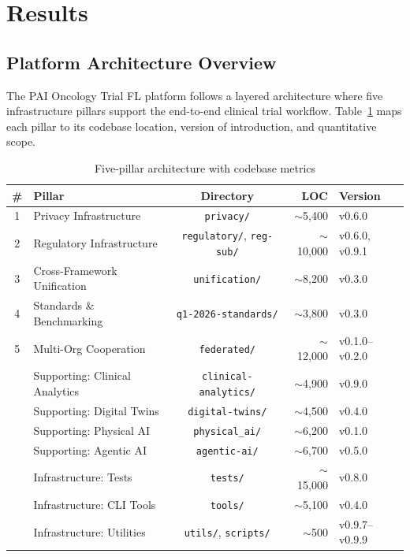 \section{Results}
\label{sec:results}

\subsection{Platform Architecture Overview}

The PAI Oncology Trial FL platform follows a layered architecture where five infrastructure pillars support the end-to-end clinical trial workflow. Table~\ref{tab:architecture} maps each pillar to its codebase location, version of introduction, and quantitative scope.

\begin{table}[H]
\centering
\caption{Five-pillar architecture with codebase metrics}
\label{tab:architecture}
\small
\begin{tabular}{@{}clcrl@{}}
\toprule
\textbf{\#} & \textbf{Pillar} & \textbf{Directory} & \textbf{LOC} & \textbf{Version} \\
\midrule
1 & Privacy Infrastructure & \texttt{privacy/} & $\sim$5,400 & v0.6.0 \\
2 & Regulatory Infrastructure & \texttt{regulatory/}, \texttt{reg-sub/} & $\sim$10,000 & v0.6.0, v0.9.1 \\
3 & Cross-Framework Unification & \texttt{unification/} & $\sim$8,200 & v0.3.0 \\
4 & Standards \& Benchmarking & \texttt{q1-2026-standards/} & $\sim$3,800 & v0.3.0 \\
5 & Multi-Org Cooperation & \texttt{federated/} & $\sim$12,000 & v0.1.0--v0.2.0 \\
\midrule
  & Supporting: Clinical Analytics & \texttt{clinical-analytics/} & $\sim$4,900 & v0.9.0 \\
  & Supporting: Digital Twins & \texttt{digital-twins/} & $\sim$4,500 & v0.4.0 \\
  & Supporting: Physical AI & \texttt{physical\_ai/} & $\sim$6,200 & v0.1.0 \\
  & Supporting: Agentic AI & \texttt{agentic-ai/} & $\sim$6,700 & v0.5.0 \\
  & Infrastructure: Tests & \texttt{tests/} & $\sim$15,000 & v0.8.0 \\
  & Infrastructure: CLI Tools & \texttt{tools/} & $\sim$5,100 & v0.4.0 \\
  & Infrastructure: Utilities & \texttt{utils/}, \texttt{scripts/} & $\sim$500 & v0.9.7--v0.9.9 \\
\bottomrule
\end{tabular}
\end{table}

